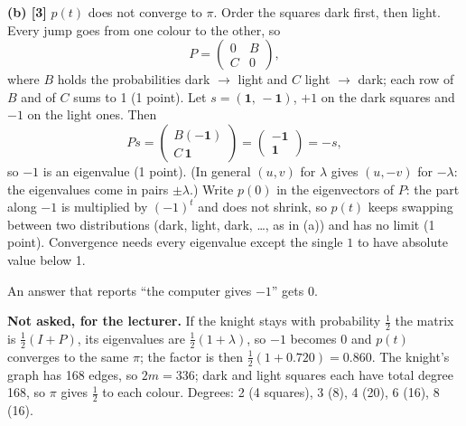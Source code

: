 \documentclass[a4paper, 11pt]{extarticle}
\newcommand{\ans}[1]{{\color{pltblue}#1}}
\begin{document}
\textbf{(b) [3]} \ans{$p(t)$ does not converge to $\pi$.} Order the squares dark first, then light.
Every jump goes from one colour to the other, so
\[
  P=\begin{pmatrix}0 & B\\ C & 0\end{pmatrix},
\]
where $B$ holds the probabilities dark $\to$ light and $C$ light $\to$ dark; each
row of $B$ and of $C$ sums to 1 (1 point). Let $s=(\mathbf 1,\,-\mathbf 1)$, $+1$ on the
dark squares and $-1$ on the light ones. Then
\[
  Ps=\begin{pmatrix}B(-\mathbf 1)\\ C\,\mathbf 1\end{pmatrix}=\begin{pmatrix}-\mathbf 1\\ \mathbf 1\end{pmatrix}=-s,
\]
so $-1$ is an eigenvalue (1 point). (In general $(u,v)$ for $\lambda$ gives $(u,-v)$ for $-\lambda$: the eigenvalues
come in pairs $\pm\lambda$.) Write $p(0)$ in the eigenvectors of $P$: the part along
$-1$ is multiplied by $(-1)^t$ and does not shrink, so $p(t)$ keeps
swapping between two distributions (dark, light, dark, \dots, as in (a)) and has no limit
(1 point). Convergence needs every eigenvalue except the single $1$ to have
absolute value below 1.

An answer that reports ``the computer gives $-1$'' gets 0.

\textbf{Not asked, for the lecturer.} If the knight stays with probability $\tfrac12$
the matrix is $\tfrac12(I+P)$, its eigenvalues are $\tfrac12(1+\lambda)$, so $-1$
becomes $0$ and $p(t)$ converges to the same $\pi$; the factor is then
$\tfrac12(1+0.720)=0.860$. The knight's graph has 168 edges, so $2m=336$; dark and
light squares each have total degree 168, so $\pi$ gives $\tfrac12$ to each colour.
Degrees: 2 (4 squares), 3 (8), 4 (20), 6 (16), 8 (16).
\end{document}
